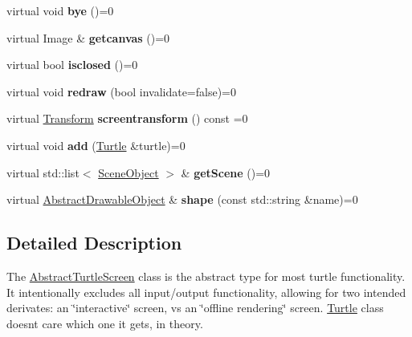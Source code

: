 \begin{DoxyCompactItemize}
\mbox{\label{classcturtle_1_1AbstractTurtleScreen_a04de9abc6c3a8f046568c7d1a842d168}} 
virtual void {\bfseries bye} ()=0
\item 
\mbox{\label{classcturtle_1_1AbstractTurtleScreen_a090a77eb87eab4a3d3e4f1b9476abff2}} 
virtual Image \& {\bfseries getcanvas} ()=0
\item 
\mbox{\label{classcturtle_1_1AbstractTurtleScreen_a5a68db439eb8e5016a290529d62610f5}} 
virtual bool {\bfseries isclosed} ()=0
\item 
\mbox{\label{classcturtle_1_1AbstractTurtleScreen_a6bf8b7618ccd22087cc4fcb95d9e2ac5}} 
virtual void {\bfseries redraw} (bool invalidate=false)=0
\item 
\mbox{\label{classcturtle_1_1AbstractTurtleScreen_a602b6058a1d56e27700155987b791056}} 
virtual \hyperlink{classcturtle_1_1Transform}{Transform} {\bfseries screentransform} () const =0
\item 
\mbox{\label{classcturtle_1_1AbstractTurtleScreen_aa82ae80751e1f6f71b07d2c0ba72e5e8}} 
virtual void {\bfseries add} (\hyperlink{classcturtle_1_1Turtle}{Turtle} \&turtle)=0
\item 
\mbox{\label{classcturtle_1_1AbstractTurtleScreen_ab4524119329c3ab3ce2a9a864ec87437}} 
virtual std\+::list$<$ \hyperlink{structcturtle_1_1SceneObject}{Scene\+Object} $>$ \& {\bfseries get\+Scene} ()=0
\item 
\mbox{\label{classcturtle_1_1AbstractTurtleScreen_a63ad1c2ec491e0a8773fc53aac0b9c3a}} 
virtual \hyperlink{classcturtle_1_1AbstractDrawableObject}{Abstract\+Drawable\+Object} \& {\bfseries shape} (const std\+::string \&name)=0
\end{DoxyCompactItemize}


\subsection{Detailed Description}
The \hyperlink{classcturtle_1_1AbstractTurtleScreen}{Abstract\+Turtle\+Screen} class is the abstract type for most turtle functionality. It intentionally excludes all input/output functionality, allowing for two intended derivates\+: an \char`\"{}interactive\char`\"{} screen, vs an \char`\"{}offline rendering\char`\"{} screen. \hyperlink{classcturtle_1_1Turtle}{Turtle} class doesn\textquotesingle{}t care which one it gets, in theory. 

